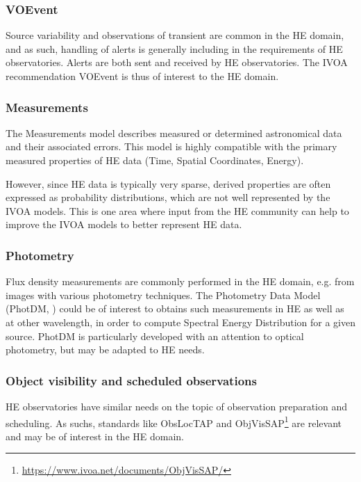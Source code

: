 \documentclass[11pt,a4paper]{ivoa}
\begin{document}
{\subsubsection{VOEvent}

Source variability and observations of transient are common in the \gls{HE} domain, and as such, handling of alerts is generally including in the requirements of \gls{HE} observatories. Alerts are both sent and received by \gls{HE} observatories. The \gls{IVOA} recommendation VOEvent \citep{2017ivoa.spec.0320S} is thus of interest to the \gls{HE} domain.


\subsubsection{Measurements}

The Measurements model \citep{2022ivoa.spec.1004R} describes measured or determined astronomical data and their associated errors.
This model is highly compatible with the primary measured properties of \gls{HE} data (Time, Spatial Coordinates, Energy).

However, since \gls{HE} data is typically very sparse, derived properties are often expressed as probability distributions, which are not
well represented by the \gls{IVOA} models.  This is one area where input from the \gls{HE} community can help to improve the \gls{IVOA} models to better
represent \gls{HE} data.


\subsubsection{Photometry}

Flux density measurements are commonly performed in the \gls{HE} domain, e.g. from images with various photometry techniques. The Photometry Data Model (PhotDM, \citealt{2022ivoa.spec.1101S}) could be of interest to obtains such measurements in \gls{HE} as well as at other wavelength, in order to compute Spectral Energy Distribution for a given source. PhotDM is particularly developed with an attention to optical photometry, but may be adapted to \gls{HE} needs.

\subsubsection{Object visibility and scheduled observations}

\gls{HE} observatories have similar needs on the topic of observation preparation and scheduling. As suchs, standards like ObsLocTAP \citep{2021ivoa.spec.0724S} and ObjVisSAP\footnote{\url{https://www.ivoa.net/documents/ObjVisSAP/}} are relevant and may be of interest in the \gls{HE} domain.


}
\end{document}
